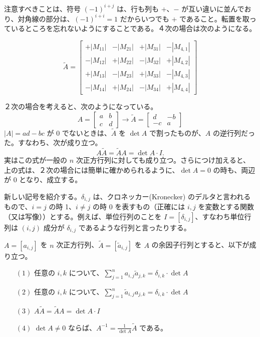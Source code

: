 注意すべきことは、符号 $(-1)^{i+j}$ は、行も列も $+$、$-$ が互い違いに並んでおり、対角線の部分は、$(-1)^{i+i} = 1$ だからいつでも $+$ であること。転置を取っているところを忘れないようにすることである。４次の場合は次のようになる。

$$\widetilde{A} = \left[\begin{array}{cccc}
+|M_{11}| & -|M_{21}| &+|M_{31}| & -|M_{4,1}| \\
-|M_{12}| & +|M_{22}| & -|M_{32}| & +|M_{4,2}|\\
+|M_{13}| & -|M_{23}| & +|M_{33}| & -|M_{4,3}|\\
-|M_{14}| & +|M_{24}| & -|M_{34}| & +|M_{4,4}|
 \end{array}\right]$$
 
２次の場合を考えると、次のようになっている。
$$A = \left[\begin{array}{cc}a & b\\c & d\end{array}\right] \to
\widetilde{A} = \left[\begin{array}{cc}d & -b\\-c & a\end{array}\right]$$
$|A| = ad-bc$ が 0 でないときは、$\widetilde{A}$ を $\det A$ で割ったものが、$A$ の逆行列だった。すなわち、次が成り立つ。
$$A\widetilde{A} = \widetilde{A}A = \det A\cdot I.$$
実はこの式が一般の $n$ 次正方行列に対しても成り立つ。さらにつけ加えると、上の式は、２次の場合には簡単に確かめられるように、$\det A = 0$ の時も、両辺が 0 となり、成立する。

\smallskip
新しい記号を紹介する。$\delta_{i,j}$ は、クロネッカー(Kronecker) のデルタと言われるもので、$i = j$ の時 1、$i\neq j$ の時 0 を表すもの（正確には $i,j$ を変数とする関数（又は写像））とする。例えば、単位行列のことを $I = [\delta_{i,j}]$、すなわち単位行列は $(i,j)$ 成分が $\delta_{i,j}$ であるような行列と言ったりする。

\begin{thm} \label{thm:ajointmat}
$A = [a_{i,j}]$ を $n$ 次正方行列、$\widetilde{A} = [\tilde{a}_{i,j}]$ を $A$ の余因子行列とすると、以下が成り立つ。
\begin{itemize}
\item[$(1)$] 任意の $i,k$ について、${\displaystyle \sum_{j = 1}^na_{i,j}\tilde{a}_{j,k} = \delta_{i,k}\cdot\det A}$
\item[$(2)$] 任意の $i,k$ について、${\displaystyle \sum_{j = 1}^n\tilde{a}_{i,j} a_{j,k}= \delta_{i,k}\cdot\det A}$
\item[$(3)$] $A\widetilde{A} = \widetilde{A}A = \det A\cdot I$
\item[$(4)$] $\det A\neq 0$ ならば、${\displaystyle A^{-1} = \frac{1}{\det A}\widetilde{A}}$ である。
\end{itemize}
\end{thm}

